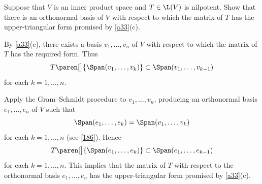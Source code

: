 \exercise
Suppose that $V$ is an inner product space and $T \in \L(V)$ is nilpotent. Show that there is an orthonormal basis of $V$ with respect to which the matrix of $T$ has the upper-triangular form promised by \ref{a33}(c).

\begin{Solution}
By \ref{a33}(c), there exists a basis $v_1, \ldots, v_n$ of $V$ with respect to which the matrix of $T$ has the required form. Thus
\[
T \paren[\big]{ \Span(v_1, \ldots, v_k) } \subset \Span(v_1, \ldots, v_{k-1})
\]
for each $k = 1, \ldots, n$.

Apply the Gram--Schmidt procedure to $v_1, \ldots, v_n$, producing an orthonormal basis $e_1, \ldots, e_n$ of $V$ such that
\[
\Span( e_1, \ldots, e_k) = \Span( v_1, \ldots, v_k)
\]
for each $k = 1, \ldots, n$ (see \ref{186}). Hence
\[
T \paren[\big]{ \Span(e_1, \ldots, e_k) } \subset \Span(e_1, \ldots, e_{k-1})
\]
for each $k = 1, \ldots, n$. This implies that the matrix of $T$ with respect to the orthonormal basis $e_1, \ldots, e_n$ has the upper-triangular form promised by \ref{a33}(c).
\end{Solution}

